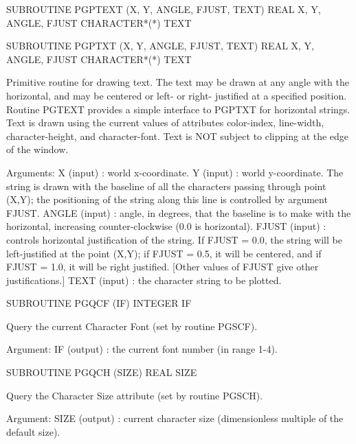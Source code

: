 {\eightpoint\begintt
      SUBROUTINE PGPTEXT (X, Y, ANGLE, FJUST, TEXT)
      REAL X, Y, ANGLE, FJUST
      CHARACTER*(*) TEXT
\endtt}

{\eightpoint\begintt
      SUBROUTINE PGPTXT (X, Y, ANGLE, FJUST, TEXT)
      REAL X, Y, ANGLE, FJUST
      CHARACTER*(*) TEXT
 
Primitive routine for drawing text. The text may be drawn at any
angle with the horizontal, and may be centered or left- or right-
justified at a specified position.  Routine PGTEXT provides a
simple interface to PGPTXT for horizontal strings. Text is drawn
using the current values of attributes color-index, line-width,
character-height, and character-font.  Text is NOT subject to
clipping at the edge of the window.
 
Arguments:
 X      (input)  : world x-coordinate.
 Y      (input)  : world y-coordinate. The string is drawn with the
                   baseline of all the characters passing through
                   point (X,Y); the positioning of the string along
                   this line is controlled by argument FJUST.
 ANGLE  (input)  : angle, in degrees, that the baseline is to make
                   with the horizontal, increasing counter-clockwise
                   (0.0 is horizontal).
 FJUST  (input)  : controls horizontal justification of the string.
                   If FJUST = 0.0, the string will be left-justified
                   at the point (X,Y); if FJUST = 0.5, it will be
                   centered, and if FJUST = 1.0, it will be right
                   justified. [Other values of FJUST give other
                   justifications.]
 TEXT   (input)  : the character string to be plotted.
\endtt}

{\eightpoint\begintt
      SUBROUTINE PGQCF (IF)
      INTEGER  IF
 
Query the current Character Font (set by routine PGSCF).
 
Argument:
 IF     (output)   : the current font number (in range 1-4).
\endtt}

{\eightpoint\begintt
      SUBROUTINE PGQCH (SIZE)
      REAL SIZE
 
Query the Character Size attribute (set by routine PGSCH).
 
Argument:
 SIZE   (output) : current character size (dimensionless multiple of
                   the default size).
\endtt}

